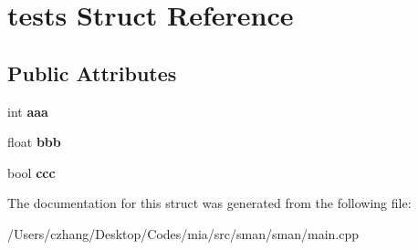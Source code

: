 \hypertarget{structtests}{\section{tests Struct Reference}
\label{structtests}
}
\subsection*{Public Attributes}
\begin{DoxyCompactItemize}
\item 
\hypertarget{structtests_a9ffa3e71f2157cbff7e6e0bbe27a2a35}{int {\bfseries aaa}}\label{structtests_a9ffa3e71f2157cbff7e6e0bbe27a2a35}

\item 
\hypertarget{structtests_aade716ac35e449a5bc1b59ab6b5cb1d5}{float {\bfseries bbb}}\label{structtests_aade716ac35e449a5bc1b59ab6b5cb1d5}

\item 
\hypertarget{structtests_a94f5600f6a9c111e59ed97216bcd7c19}{bool {\bfseries ccc}}\label{structtests_a94f5600f6a9c111e59ed97216bcd7c19}

\end{DoxyCompactItemize}


The documentation for this struct was generated from the following file\-:\begin{DoxyCompactItemize}
\item 
/\-Users/czhang/\-Desktop/\-Codes/mia/src/sman/sman/main.\-cpp\end{DoxyCompactItemize}
